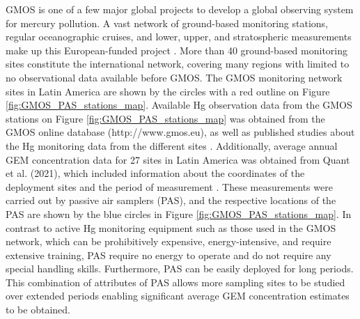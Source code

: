 \begin{flushleft}
 GMOS is one of a few major global projects to develop a global observing system for mercury pollution. A vast network of ground-based monitoring stations, regular oceanographic cruises, and lower, upper, and stratospheric measurements make up this European-funded project \cite{sprovieri_atmospheric_2016,koenig_seasonal_2021}. More than 40 ground-based monitoring sites constitute the international network, covering many regions with limited to no observational data available before GMOS\cite{sprovieri_atmospheric_2016}. The GMOS monitoring network sites in Latin America are shown by the circles with a red outline on Figure \ref{fig:GMOS_PAS_stations_map}. Available Hg observation data from the GMOS stations on Figure  \ref{fig:GMOS_PAS_stations_map} was obtained from the GMOS online database (http://www.gmos.eu), as well as published studies about the Hg monitoring data from the different sites  \cite{koenig_seasonal_2021}. Additionally, average annual GEM concentration data for 27 sites in Latin America was obtained from Quant et al. (2021), which included information about the coordinates of the deployment sites and the period of measurement \cite{quant_measuring_2021}. These measurements were carried out by passive air samplers (PAS),  and the respective locations of the PAS are shown by the blue circles in Figure \ref{fig:GMOS_PAS_stations_map}. In contrast to active Hg monitoring equipment such as those used in the GMOS network, which can be prohibitively expensive, energy-intensive, and require extensive training, PAS require no energy to operate and do not require any special handling skills. Furthermore, PAS can be easily deployed for long periods. This combination of attributes of PAS allows more sampling sites to be studied over extended periods enabling significant average GEM concentration estimates to be obtained. 
\end{flushleft}




